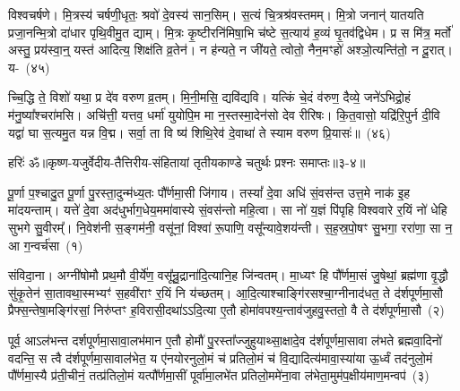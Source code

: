 विश्वचर्\mbox{}षणे। मि॒त्रस्य॑ चर्\mbox{}षणी॒धृतः॒ श्रवो॑ दे॒वस्य॑ सान॒सिम्। स॒त्यं चि॒त्रश्र॑वस्तमम्। मि॒त्रो जनान्॑ यातयति प्रजा॒नन्मि॒त्रो दा॑धार पृथि॒वीमु॒त द्याम्। मि॒त्रः कृ॒ष्टीरनि॑मिषा॒भि च॑ष्टे स॒त्याय॑ ह॒व्यं घृ॒तव॑द्विधेम। प्र स मि॑त्र॒ मर्तो॑ अस्तु॒ प्रय॑स्वा॒न्॒ यस्त॑ आदित्य॒ शिक्ष॑ति व्र॒तेन॑। न ह॑न्यते॒ न जी॑यते॒ त्वोतो॒ नैन॒मꣳहो॑ अश्ञो॒त्यन्ति॑तो॒ न दू॒रात्। य-~(४५)\ip

च्चि॒द्धि ते॒ विशो॑ यथा॒ प्र दे॑व वरुण व्र॒तम्। मि॒नी॒मसि॒ द्यवि॑द्यवि। यत्किं चे॒दं व॑रुण॒ दैव्ये॒ जने॑\-ऽभिद्रो॒हं म॑नु॒ष्या᳚श्चरा॑मसि। अचि॑त्ती॒ यत्तव॒ धर्मा॑ युयोपि॒म मा न॒स्तस्मा॒देन॑सो देव रीरिषः। कि॒त॒वासो॒ यद्रि॑रि॒पुर्न दी॒वि यद्वा॑ घा स॒त्यमु॒त यन्न वि॒द्म। सर्वा॒ ता वि ष्य॑ शिथि॒रेव॑ दे॒वाथा॑ ते स्याम वरुण प्रि॒यासः॑॥~(४६)\ip

{\anuvakamend[{सोमो॒ गोषु॒ मा र॒यिं मन्त्रो॒ यच्छि॑थि॒रा स॒प्त च॑}]}%

{हरिः॑ ॐ}{॥कृष्ण-यजुर्वेदीय-तैत्तिरीय-संहितायां तृतीयकाण्डे चतुर्थः प्रश्नः समाप्तः॥३-४॥}



\setcounter{anuvakam}{0}
पू॒र्णा प॒श्चादु॒त पू॒र्णा पु॒रस्ता॒दुन्म॑ध्य॒तः पौ᳚र्णमा॒सी जि॑गाय। तस्यां᳚ दे॒वा अधि॑ सं॒वस॑न्त उत्त॒मे नाक॑ इ॒ह मा॑दयन्ताम्। यत्ते॑ दे॒वा अद॑धुर्भाग॒\-धेय॒ममा॑वास्ये सं॒वस॑न्तो महि॒त्वा। सा नो॑ य॒ज्ञं पि॑पृहि विश्ववारे र॒यिं नो॑ धेहि सुभगे सु॒वीरम्᳚। नि॒वेश॑नी स॒ङ्गम॑नी॒ वसू॑नां॒ विश्वा॑ रू॒पाणि॒ वसू᳚न्यावे॒शय॑न्ती। स॒ह॒स्र॒पो॒षꣳ सु॒भगा॒ ररा॑णा॒ सा न॒ आ ग॒न्वर्च॑सा~(१)\ip

संविदा॒ना। अग्नी॑षोमौ प्रथ॒मौ वी॒र्ये॑ण॒ वसू᳚न्रु॒द्राना॑दि॒त्यानि॒ह जि॑न्वतम्। मा॒ध्यꣳ हि पौ᳚र्णमा॒सं जु॒षेथां॒ ब्रह्म॑णा वृ॒द्धौ सु॑कृ॒तेन॑ सा॒तावथा॒स्मभ्यꣳ॑ स॒हवी॑राꣳ र॒यिं नि य॑च्छतम्। आ॒दि॒त्याश्चाङ्गि॑रसश्चा॒ग्नीनाद॑धत॒ ते द॑र्\mbox{}शपूर्णमा॒सौ प्रैफ्स॒न्तेषा॒\-मङ्गि॑रसां॒ निरु॑प्तꣳ ह॒विरासी॒दथा॑\-ऽऽ\-दि॒त्या ए॒तौ होमा॑वपश्य॒न्ता\-व॑जुहवु॒स्ततो॒ वै ते द॑र्\mbox{}शपूर्णमा॒सौ~(२)\ip

पूर्व॒ आ\-ऽल॑भन्त दर्\mbox{}श\-पूर्ण\-मा॒सावा॒लभ॑मान ए॒तौ होमौ॑ पु॒रस्ता᳚ज्जुहुयाथ्सा॒क्षादे॒व द॑र्\mbox{}शपूर्णमा॒सावा ल॑भते ब्रह्मवा॒दिनो॑ वदन्ति॒ स त्वै द॑र्\mbox{}शपूर्णमा॒सावा\-ल॑भेत॒ य ए॑नयोरनुलो॒मं च॑ प्रतिलो॒मं च॑ वि॒द्यादित्य॑मावा॒स्या॑या ऊ॒र्ध्वं तद॑नुलो॒मं पौ᳚र्णमा॒स्यै प्र॑ती॒चीनं॒ तत्प्र॑तिलो॒मं यत्पौ᳚र्णमा॒सीं पूर्वा॑मा॒लभे॑त प्रतिलो॒ममे॑ना॒वा ल॑भेता॒मुम॑प॒क्षीय॑माण॒मन्वप॑~(३)\ip

